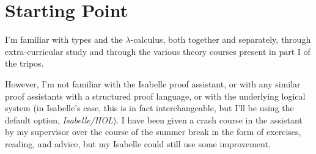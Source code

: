\documentclass[12pt]{article}
\begin{document}
\section*{Starting Point}
I'm familiar with types and the \(\lambda\)-calculus, both together and separately, through extra-curricular study and through the various theory courses present in part I of the tripos.

However, I'm not familiar with the Isabelle proof assistant, or with any similar proof assistants with a structured proof language, or with the underlying logical system (in Isabelle's case, this is in fact interchangeable, but I'll be using the default option, \emph{Isabelle/HOL}).
I have been given a crash course in the assistant by my supervisor over the course of the summer break in the form of exercises, reading, and advice, but my Isabelle could still use some improvement.
\end{document}
